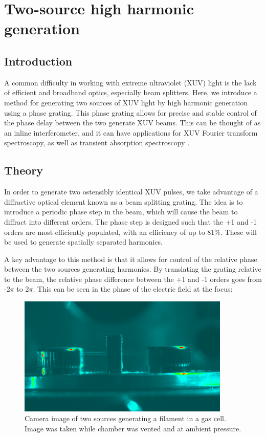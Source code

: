 \chapter{Two-source high harmonic generation}
\label{two_source}

\section{Introduction}
\label{intro_ts}

A common difficulty in working with extreme ultraviolet (XUV) light is the lack of efficient and broadband optics, especially beam splitters. Here, we introduce a method for generating two sources of XUV light by high harmonic generation using a phase grating.  This phase grating allows for precise and stable control of the phase delay between the two generate XUV beams.  This can be thought of as an inline interferometer, and it can have applications for XUV Fourier transform spectroscopy, as well as transient absorption spectroscopy \cite{diffuse}.

\section{Theory}
\label{theory_ts}

In order to generate two ostensibly identical XUV pulses, we take advantage of a diffractive optical element known as a beam splitting grating.   The idea is to introduce a periodic phase step in the beam, which will cause the beam to diffract into different orders.  The phase step is designed such that the +1 and -1 orders are most efficiently populated, with an efficiency of up to 81$\%$.  These will be used to generate spatially separated harmonics.

A key advantage to this method is that it allows for control of the relative phase between the two sources generating harmonics.  By translating the grating relative to the beam, the relative phase difference between the +1 and -1 orders goes from -2$\pi$ to 2$\pi$.  This can be seen in the phase of the electric field at the focus:



\begin{figure}
	\centering
	\includegraphics[width=0.9\textwidth]{figures/Two_source/ts_filament_gas_cell.png}
	\caption{Camera image of two sources generating a filament in a gas cell. Image was taken while chamber was vented and at ambient pressure.}
	\label{my_anita}
\end{figure}

